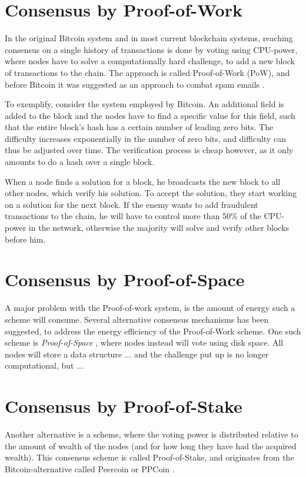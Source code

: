 \documentclass[oneside,a4paper,10pts,article]{memoir}
\begin{document}
\section{Consensus by Proof-of-Work}
In the original Bitcoin system and in most current blockchain systems,
reaching consensus on a single history of transactions is done by
voting using CPU-power, where nodes have to solve a computationally
hard challenge, to add a new block of transactions to the chain. The
approach is called Proof-of-Work (PoW), and before Bitcoin it was suggested
as an approach to combat spam emails \cite{dwork1992pricing}.

To exemplify, consider the system employed by Bitcoin. An additional
field is added to the block and the nodes have to find a specific
value for this field, such that the entire block's hash has a certain
number of leading zero bits. The difficulty increases exponentially in
the number of zero bits, and difficulty can thus be adjusted over
time. The verification process is cheap however, as it only amounts to
do a hash over a single block.

When a node finds a solution for a block, he broadcasts the new block
to all other nodes, which verify his solution. To accept the solution,
they start working on a solution for the next block. If the enemy
wants to add fraudulent transactions to the chain, he will have to
control more than 50\% of the CPU-power in the network, otherwise the
majority will solve and verify other blocks before him.


\section{Consensus by Proof-of-Space}
A major problem with the Proof-of-work system, is the amount of energy
such a scheme will consume. Several alternative consensus mechanisms
has been suggested, to address the energy efficiency of the
Proof-of-Work scheme. One such scheme is \emph{Proof-of-Space}
\cite{dziembowski2015proofs}, where nodes instead will vote using disk
space. All nodes will store a data structure ... and the challenge
put up is no longer computational, but ...

\section{Consensus by Proof-of-Stake}
Another alternative is a scheme, where the voting power is distributed
relative to the amount of wealth of the nodes (and for how long they
have had the acquired wealth). This consensus scheme is called
Proof-of-Stake, and originates from the Bitcoin-alternative called
Peercoin or PPCoin \cite{king2012ppcoin}.
\end{document}
